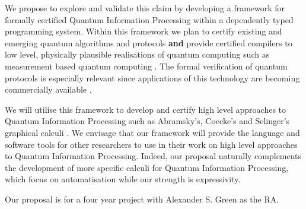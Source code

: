 \documentclass[a4paper]{article}
\begin{document}
We propose to explore and validate this claim by developing a
framework for formally certified Quantum Information Processing within a
dependently typed programming system. Within this framework we plan to
certify existing and emerging quantum algorithms and protocols \textbf{and}
provide certified compilers to low level, physically plausible
realisations of quantum computing such as measurement based quantum
computing %
.  The formal verification of 
quantum protocols is especially relevant since applications of this
technology are becoming commercially available .

We will utilise this framework to develop and certify high level
approaches to Quantum Information Processing such as Abramsky's,
Coecke's and Selinger's graphical calculi %
. 
We envisage
that our framework will provide the language and software tools for
other researchers to use in their work on high level approaches to
Quantum Information Processing. Indeed, our proposal naturally
complements the development of more specific calculi for Quantum
Information Processing, which focus on automatisation while our
strength is expressivity.%

Our proposal is for a four year project with Alexander S. Green as the
RA.
\end{document}
